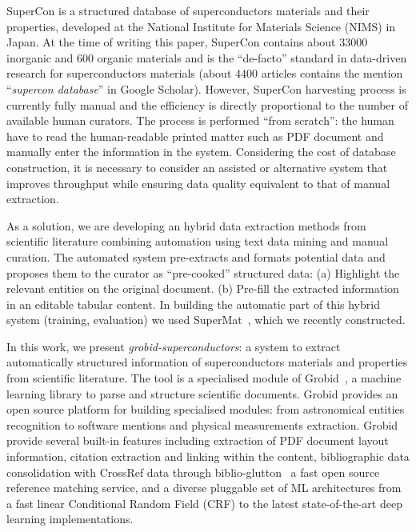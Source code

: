 \documentclass{article}
\begin{document}
SuperCon is a structured database of superconductors materials and their properties, developed at the National Institute for Materials Science (NIMS) in Japan. 
At the time of writing this paper, SuperCon contains about 33000 inorganic and 600 organic materials and is the ``de-facto'' standard in data-driven research for superconductors materials  (about 4400 articles contains the mention ``\textit{supercon database}'' in Google Scholar). 
However, SuperCon harvesting process is currently fully manual and the efficiency is directly proportional to the number of available human curators.
The process is performed ``from scratch'': the human have to read the human-readable printed matter such as PDF document and manually enter the information in the system.
Considering the cost of database construction, it is necessary to consider an assisted or alternative system that improves throughput while ensuring data quality equivalent to that of manual extraction.

As a solution, we are developing an hybrid data extraction methods from scientific literature combining automation using text data mining and manual curation.
The automated system pre-extracts and formats potential data and proposes them to the curator as ``pre-cooked'' structured data: (a) Highlight the relevant entities on the original document. 
(b) Pre-fill the extracted information in an editable tabular content. 
In building the automatic part of this hybrid system (training, evaluation) we used SuperMat~\cite{foppiano2021supermat}, which we recently constructed. 

In this work, we present \textit{grobid-superconductors}: a system to extract automatically structured information of superconductors materials and properties from scientific literature. 
The tool is a specialised module of Grobid~\cite{GROBID}, a machine learning library to parse and structure scientific documents. 
Grobid provides an open source platform for building specialised modules: from astronomical entities recognition to software mentions and physical measurements extraction.
Grobid provide several built-in features including extraction of PDF document layout information, citation extraction and linking within the content, bibliographic data consolidation with CrossRef data through biblio-glutton~\cite{biblio-glutton-lookup} a fast open source reference matching service, and a diverse pluggable set of ML architectures from a fast linear Conditional Random Field (CRF) to the latest state-of-the-art deep learning implementations.
\end{document}
